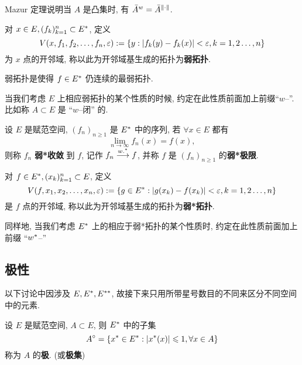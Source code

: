 Mazur 定理说明当 $ A $ 是凸集时, 有 $ \bar{A}^{w}=\bar{A}^{\left\| \cdot \right\|} $.

\begin{Definition}[弱拓扑]\label{def:弱拓扑}
	对 $ x\in E, (f_{k})_{k=1}^{n}\subset E^{*} $, 定义
	\[
		V(x, f_{1}, f_{2}, \dots, f_{n}, \varepsilon):=\{ y:\left| f_{k}(y)-f_{k}(x) \right| <\varepsilon, k=1, 2\dots, n \}
	\]
	为 $ x $ 点的开邻域, 称以此为开邻域基生成的拓扑为\textbf{弱拓扑}.
\end{Definition}
\begin{Remark}
	弱拓扑是使得 $ f\in E^{*} $ 仍连续的最弱拓扑.
\end{Remark}
\begin{Remark}
	当我们考虑 $ E $ 上相应弱拓扑的某个性质的时候, 约定在此性质前面加上前缀``$ w $--''. 比如称 $ A\subset E $ 是 ``$ w $--闭'' 的.
\end{Remark}

\begin{Definition}[弱*收敛]\label{def:弱*收敛}
	设 $ E $ 是赋范空间, $ (f_{n})_{n\geqslant1} $ 是 $ E^{*} $ 中的序列, 若 $ \forall x\in E $ 都有
	\[
		\lim_{n\to\infty}f_{n}(x)=f(x),
	\]
	则称 $ f_{n} $ \textbf{弱*收敛} 到 $ f $, 记作 $ f_{n}\overset{w.^{*}}{\longrightarrow} f $, 并称 $ f $ 是 $ (f_{n})_{n\geqslant1} $ 的\textbf{弱*极限}.
\end{Definition}
\begin{Definition}[弱*拓扑]\label{def:弱*拓扑}
	对 $ f\in E^{*}, (x_{k})_{k=1}^{n}\subset E $, 定义
	\[
		V(f, x_{1}, x_{2}, \dots, x_{n}, \varepsilon):=\{ g\in E^{*}:\left| g(x_{k})-f(x_{k}) \right| <\varepsilon, k=1, 2\dots, n \}
	\]
	是 $ f $ 点的开邻域, 称以此为开邻域基生成的拓扑为\textbf{弱*拓扑}.
\end{Definition}
\begin{Remark}
	同样地, 当我们考虑 $ E^{*} $ 上的相应于弱*拓扑的某个性质时, 约定在此性质前面加上前缀 ``$w^{*}$--''
\end{Remark}


\subsection{极性}
以下讨论中因涉及 $ E, E^{*}, E^{**} $, 故接下来只用所带星号数目的不同来区分不同空间中的元素.

\begin{Definition}[极]\label{def:极}
	设 $ E $ 是赋范空间, $ A\subset E $, 则 $ E^{*} $ 中的子集
	\[
		A^{\circ} = \{ x^{*}\in E^{*}:\left| x^{*}(x) \right| \leqslant1, \forall x\in A \}
	\]
	称为 $ A $ 的\textbf{极}. (或\textbf{极集})
\end{Definition}

